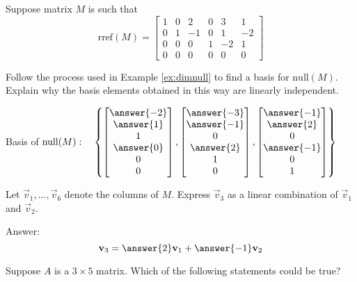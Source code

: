 \documentclass{ximera}
\begin{document}
\begin{problem}
Suppose matrix $M$ is such that 
$$\mbox{rref}(M)=\begin{bmatrix}1&0&2&0&3&1\\0&1&-1&0&1&-2\\0&0&0&1&-2&1\\0&0&0&0&0&0\end{bmatrix}$$

\begin{problem}\label{prob:nullM1}
Follow the process used in Example \ref{ex:dimnull} to find a basis for $\mbox{null}(M)$.  Explain why the basis elements obtained in this way are linearly independent.

Basis of $\mbox{null}(M):\quad\left\{\begin{bmatrix}\answer{-2}\\\answer{1}\\1\\\answer{0}\\0\\0\end{bmatrix}, \begin{bmatrix}\answer{-3}\\\answer{-1}\\0\\\answer{2}\\1\\0\end{bmatrix}, \begin{bmatrix}\answer{-1}\\\answer{2}\\0\\\answer{-1}\\0\\1\end{bmatrix} \right\}$
\end{problem}

\begin{problem}\label{prob:nullM2}
Let $\vec{v}_1,\ldots,\vec{v}_6$ denote the columns of $M$.  Express $\vec{v}_3$ as a linear combination of $\vec{v}_1$ and $\vec{v}_2$.

Answer:
$$\vec{v}_3=\answer{2}\vec{v}_1+\answer{-1}\vec{v}_2$$
\end{problem}
\end{problem}

\begin{problem}\label{prob:truefalse3by5}
Suppose $A$ is a $3\times 5$ matrix.  Which of the following statements could be true?
\begin{selectAll}
 \end{selectAll}
\end{problem}
\end{document}
